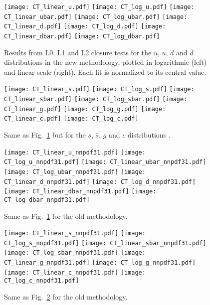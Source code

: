 \begin{figure}[ht]
    \centering
    \texttt{[image: CT\_linear\_u.pdf]}
    \texttt{[image: CT\_log\_u.pdf]}
    \texttt{[image: CT\_linear\_ubar.pdf]}
    \texttt{[image: CT\_log\_ubar.pdf]}
    \texttt{[image: CT\_linear\_d.pdf]}
    \texttt{[image: CT\_log\_d.pdf]}
    \texttt{[image: CT\_linear\_dbar.pdf]}
    \texttt{[image: CT\_log\_dbar.pdf]}
    \caption{Results from L0, L1 and L2 closure tests for the $u$, $\bar{u}$, $d$ and $\bar{d}$ distributions in the new methodology,
    plotted in logarithmic (left) and linear scale (right). Each fit is normalized to its central value.}
    \label{fig:nnpdf40_ct_errors1}    
\end{figure}

\begin{figure}[ht]
    \centering
    \texttt{[image: CT\_linear\_s.pdf]}
    \texttt{[image: CT\_log\_s.pdf]}
    \texttt{[image: CT\_linear\_sbar.pdf]}
    \texttt{[image: CT\_log\_sbar.pdf]}
    \texttt{[image: CT\_linear\_g.pdf]}
    \texttt{[image: CT\_log\_g.pdf]}
    \texttt{[image: CT\_linear\_c.pdf]}
    \texttt{[image: CT\_log\_c.pdf]}
    \caption{Same as Fig.~\ref{fig:nnpdf40_ct_errors1} but for the $s$, $\bar{s}$, $g$ and $c$ distributions .}
    \label{fig:nnpdf40_ct_errors2}    
\end{figure}

\begin{figure}[ht]
    \centering
    \texttt{[image: CT\_linear\_u\_nnpdf31.pdf]}
    \texttt{[image: CT\_log\_u\_nnpdf31.pdf]}
    \texttt{[image: CT\_linear\_ubar\_nnpdf31.pdf]}
    \texttt{[image: CT\_log\_ubar\_nnpdf31.pdf]}
    \texttt{[image: CT\_linear\_d\_nnpdf31.pdf]}
    \texttt{[image: CT\_log\_d\_nnpdf31.pdf]}
    \texttt{[image: CT\_linear\_dbar\_nnpdf31.pdf]}
    \texttt{[image: CT\_log\_dbar\_nnpdf31.pdf]}
    \caption{Same as Fig.~\ref{fig:nnpdf40_ct_errors1} for the old methodology.}
    \label{fig:nnpdf31_ct_errors1}    
\end{figure}

\begin{figure}[ht]
    \centering
    \texttt{[image: CT\_linear\_s\_nnpdf31.pdf]}
    \texttt{[image: CT\_log\_s\_nnpdf31.pdf]}
    \texttt{[image: CT\_linear\_sbar\_nnpdf31.pdf]}
    \texttt{[image: CT\_log\_sbar\_nnpdf31.pdf]}
    \texttt{[image: CT\_linear\_g\_nnpdf31.pdf]}
    \texttt{[image: CT\_log\_g\_nnpdf31.pdf]}
    \texttt{[image: CT\_linear\_c\_nnpdf31.pdf]}
    \texttt{[image: CT\_log\_c\_nnpdf31.pdf]}
    \caption{Same as Fig.~\ref{fig:nnpdf40_ct_errors2} for the old methodology.}
    \label{fig:nnpdf31_ct_errors2}    
\end{figure}
